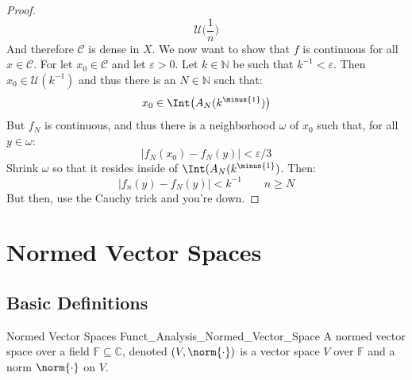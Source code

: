 \documentclass[crop=false,class=book,oneside]{standalone}                      %
\begin{document}
\begin{proof}
\begin{equation}
                    \mathcal{U}\big(\frac{1}{n}\big)
            \end{equation}
            And therefore $\mathcal{C}$ is dense in $X$. We
            now want to show that $f$ is continuous for all
            $x\in\mathcal{C}$. For let $x_{0}\in\mathcal{C}$ and
            let $\varepsilon>0$. Let $k\in\mathbb{N}$ be such that
            $k^{\minus{1}}<\varepsilon$. Then
            $x_{0}\in\mathcal{U}(k^{\minus{1}})$ and thus there is
            an $N\in\mathbb{N}$ such that:
            \begin{equation}
                x_{0}\in\Int\big(A_{N}(k^{\minus{1}})\big)
            \end{equation}
            But $f_{N}$ is continuous, and thus there is a
            neighborhood $\omega$ of $x_{0}$ such that, for all
            $y\in\omega$:
            \begin{equation}
                |f_{N}(x_{0})-f_{N}(y)|<\varepsilon/3
            \end{equation}
            Shrink $\omega$ so that it resides inside of
            $\Int(A_{N}(k^{\minus{1}})$. Then:
            \begin{equation}
                |f_{n}(y)-f_{N}(y)|<k^{\minus{1}}
                \quad\quad
                n\geq{N}
            \end{equation}
            But then, use the Cauchy trick and you're down.
        \end{proof}
        \newpage
    \section{Normed Vector Spaces}
        \subsection{Basic Definitions}
            \begin{ldefinition}{Normed Vector Spaces}
                  {Funct_Analysis_Normed_Vector_Space}
                A normed vector space over a field
                $\mathbb{F}\subseteq\mathbb{C}$, denoted
                $(V,\norm{\cdot})$ is a vector space $V$ over
                $\mathbb{F}$ and a norm $\norm{\cdot}$ on $V$.
            \end{ldefinition}
\end{document}
